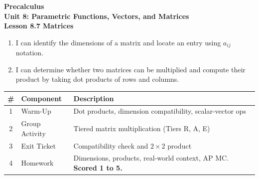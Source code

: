 \documentclass[10pt]{article}
\begin{document}
\vspace{-0.8in}

\begin{center}
  {\color{white}\textbf{\LARGE Precalculus}}\\[4pt]
  {\color{skymid}\large\textbf{Unit 8: Parametric Functions, Vectors, and Matrices}}\\[6pt]
  {\color{white}\textbf{\large Lesson 8.7 \quad Matrices}}
\end{center}

\vspace{0.22in}
\namedateperiod
\vspace{0.18in}

\begin{learningtargetbox}
\small
\begin{enumerate}[leftmargin=1.5em, itemsep=5pt]
  \item I can identify the dimensions of a matrix and locate an entry using $a_{ij}$ notation.
  \item I can determine whether two matrices can be multiplied and compute their product by taking dot products of rows and columns.
\end{enumerate}
\end{learningtargetbox}

\vspace{0.14in}

\begin{tocbox}
\small
\renewcommand{\arraystretch}{1.5}
\begin{tabularx}{\linewidth}{@{} c l X @{}}
\rowcolor{sky}
\textbf{\#} & \textbf{Component} & \textbf{Description} \\
\midrule
1 & Warm-Up        & Dot products, dimension compatibility, scalar-vector ops \\
2 & Group Activity & Tiered matrix multiplication (Tiers R, A, E) \\
3 & Exit Ticket    & Compatibility check and $2\times 2$ product \\
4 & Homework       & Dimensions, products, real-world context, AP MC. \textbf{Scored 1 to 5.} \\
\end{tabularx}
\end{tocbox}
\end{document}

